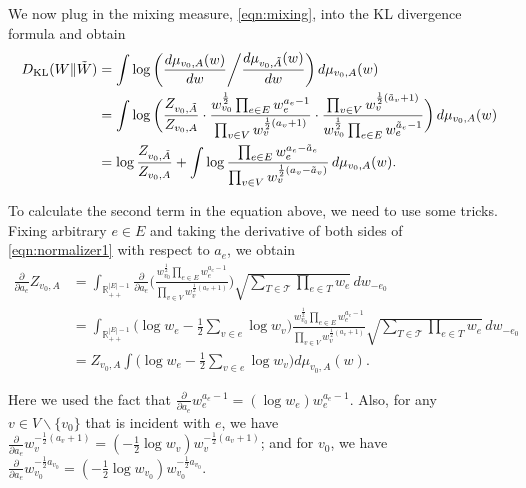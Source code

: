 \documentclass[a4paper, 11pt]{article}
\newcommand{\dkl}{D_{\textnormal{KL}}}
\begin{document}
We now plug in the mixing measure, \cref{eqn:mixing}, into the KL divergence formula and obtain
\begin{align}
\label{eqn:kl4}
\dkl(W\|\tilde{W})
&=  \int \log\bigg(\frac{d\mu_{v_0,A}(w)}{dw}\bigg\slash \frac{d\mu_{v_0,\tilde{A}}(w)}{dw}\bigg)\,d\mu_{v_0,A}(w)\nonumber \\
&=  \int \log\bigg(\frac{Z_{v_0, \tilde{A}}}{Z_{v_0, A}}\cdot \frac{w_{v_0}^{\frac{1}{2}}\prod_{e\in E} w_e^{a_e-1}}{\prod_{v\in V}w_v^{\frac{1}{2}(a_v+1)}}\cdot \frac{\prod_{v\in V}w_v^{\frac{1}{2}(\tilde{a}_v+1)}}{w_{v_0}^{\frac{1}{2}}\prod_{e\in E} w_e^{\tilde{a}_e-1}}\bigg)\,d\mu_{v_0,A}(w)\nonumber \\
&= \log\frac{Z_{v_0, \tilde{A}}}{Z_{v_0, A}} + \int \log\frac{\prod_{e\in E}w_e^{a_e-\tilde{a}_e}}{\prod_{v\in V}w_v^{\frac{1}{2}(a_v-\tilde{a}_v)}}\,d\mu_{v_0,A}(w).
\end{align}

To calculate the second term in the equation above, we need to use some tricks. Fixing arbitrary $e\in E$ and taking the derivative of both sides of \cref{eqn:normalizer1} with respect to $a_e$, we obtain
\begin{align*}
\frac{\partial}{\partial a_e}Z_{v_0, A}
&= \int_{\mathbb{R}_{++}^{|E|-1}} \frac{\partial}{\partial a_e}\Bigg(\frac{w_{v_0}^{\frac{1}{2}}\prod_{e\in E}w_e^{a_e-1}} {\prod_{v\in V}w_v^{\frac{1}{2}(a_v+1)}}
\Bigg)\sqrt{\sum_{T\in\mathcal{T}}\prod_{e\in T}w_e}\,dw_{-e_0}\\
&= \int_{\mathbb{R}_{++}^{|E|-1}} \bigg(\log w_e-\frac{1}{2}\sum_{v\in e}\log w_v\bigg)\frac{w_{v_0}^{\frac{1}{2}}\prod_{e\in E}w_e^{a_e-1}} {\prod_{v\in V}w_v^{\frac{1}{2}(a_v+1)}}
\sqrt{\sum_{T\in\mathcal{T}}\prod_{e\in T}w_e}\,dw_{-e_0}\\
&= Z_{v_0, A}\int\bigg(\log w_e-\frac{1}{2}\sum_{v\in e}\log w_v\bigg)d\mu_{v_0,A}(w).
\end{align*}

Here we used the fact that $\frac{\partial}{\partial a_e}w_e^{a_e-1}=(\log w_e)w_e^{a_e-1}$. Also, for any $v\in V\backslash\{v_0\}$ that is incident with $e$, we have $\frac{\partial}{\partial a_e}w_v^{-\frac{1}{2}(a_v+1)}=(-\frac{1}{2}\log w_v)w_v^{-\frac{1}{2}(a_v+1)}$; and for $v_0$, we have $\frac{\partial}{\partial a_e}w_{v_0}^{-\frac{1}{2}a_{v_0}}=(-\frac{1}{2}\log w_{v_0})w_{v_0}^{-\frac{1}{2}a_{v_0}}$.
\end{document}
